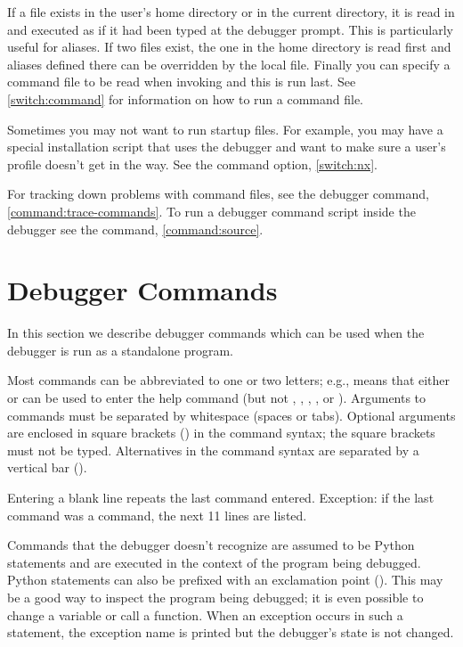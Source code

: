 If a file 
 exists
in the user's home directory or in the current directory, it is read
in and executed as if it had been typed at the debugger prompt.  This
is particularly useful for aliases.  If two files exist, the one in
the home directory is read first and aliases defined there can be
overridden by the local file. Finally you can specify a command file
to be read when invoking  and this is run last. See
\ref{switch:command} for information on how to run a command file.

Sometimes you may not want to run startup files. For example,
you may have a special installation script that uses the debugger and
want to make sure a user's profile doesn't get in the way. See
the  command option, \ref{switch:nx}.

For tracking down problems with command files, see the  debugger command, \ref{command:trace-commands}. To run a
debugger command script inside the debugger see the 
command, \ref{command:source}.

\section{Debugger Commands\label{pydb-commands}}

In this section we describe debugger commands which can be used when
the debugger is run as a standalone program.

Most commands can be abbreviated to one or two letters;
e.g.,  means that either  or  can be
used to enter the help command (but not , ,
, , or ).  Arguments to commands must
be separated by whitespace (spaces or tabs).  Optional arguments are
enclosed in square brackets (\samp{[]}) in the command syntax; the
square brackets must not be typed.  Alternatives in the command syntax
are separated by a vertical bar (\samp{|}).

Entering a blank line repeats the last command entered.  Exception: if
the last command was a  command, the next 11 lines are
listed.

Commands that the debugger doesn't recognize are assumed to be Python
statements and are executed in the context of the program being
debugged.  Python statements can also be prefixed with an exclamation
point (\samp{!}).  This may be a good way to inspect the program being
debugged; it is even possible to change a variable or call a function.
When an exception occurs in such a statement, the exception name is
printed but the debugger's state is not changed.

